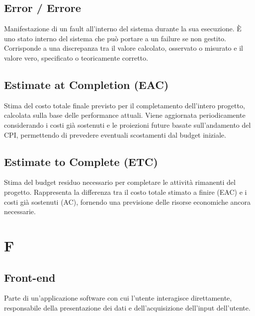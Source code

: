 \documentclass[a4paper,11pt]{article}
\begin{document}
\subsection{Error / Errore}
Manifestazione di un fault all'interno del sistema durante la sua esecuzione. È uno stato interno del sistema che può portare a un failure se non gestito. Corrisponde a una discrepanza tra il valore calcolato, osservato o misurato e il valore vero, specificato o teoricamente corretto.






\subsection{Estimate at Completion (EAC)}
Stima del costo totale finale previsto per il completamento dell'intero progetto, calcolata sulla base delle performance attuali. Viene aggiornata periodicamente considerando i costi già sostenuti e le proiezioni future basate sull'andamento del CPI, permettendo di prevedere eventuali scostamenti dal budget iniziale.






\subsection{Estimate to Complete (ETC)}
Stima del budget residuo necessario per completare le attività rimanenti del progetto. Rappresenta la differenza tra il costo totale stimato a finire (EAC) e i costi già sostenuti (AC), fornendo una previsione delle risorse economiche ancora necessarie.


\newpage





\section{F}

\subsection{Front-end}
Parte di un'applicazione software con cui l'utente interagisce direttamente, responsabile della presentazione dei dati e dell'acquisizione dell'input dell'utente.
\end{document}
